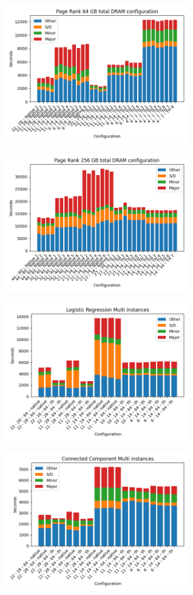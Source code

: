 \documentclass[twocolumn,10pt]{asme2e}
\begin{document}
\begin{figure}[h!]
        \includegraphics[width=13cm,height=6cm]{pr64.png}
\end{figure}

\begin{figure}[h!]
        \includegraphics[width=13cm,height=6cm]{pr256.png}
\end{figure}

\begin{figure}[h!]
        \includegraphics[width=13cm,height=6cm]{logr64.png}
\end{figure}

\begin{figure}[h!]
        \includegraphics[width=13cm,height=6cm]{cc64.png}
\end{figure}
\end{document}

